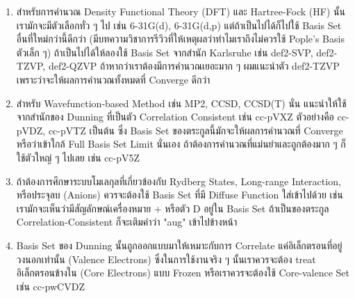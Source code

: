 \begin{enumerate}
  \item สำหรับการคำนวณ Density Functional Theory (DFT) และ Hartree-Fock (HF) นั้นเรามักจะมีตัวเลือกทั่ว ๆ ไป เช่น
        6-31G(d), 6-31G(d,p) แต่ถ้าเป็นไปได้ก็ไปใช้ Basis Set อื่นที่ใหม่กว่านี้ดีกว่า (มีบทความวิชาการรีวิวที่ให้เหตุผลว่าทำไมเราถึงไม่ควรใช้
        Pople's Basis ตัวเล็ก ๆ) ถ้าเป็นไปได้ให้ลองใช้ Basis Set จากสำนัก Karlsruhe เช่น def2-SVP, def2-TZVP, def2-QZVP
        ถ้าหากว่าเราต้องมีการคำนวณเยอะมาก ๆ ผมแนะนำตัว def2-TZVP เพราะว่าจะให้ผลการคำนวณทั้งหมดที่ Converge ดีกว่า

  \item สำหรับ Wavefunction-based Method เช่น MP2, CCSD, CCSD(T) นั่น แนะนำให้ใช้จากสำนักของ Dunning ที่เป็นตัว
        Correlation Consistent เช่น cc-pVXZ ตัวอย่างคือ cc-pVDZ, cc-pVTZ เป็นต้น ซึ่ง Basis Set ของตระกูลนี้มักจะให้ผลการคำนวณที่
        Converge หรือว่าเข้าใกล้ Full Basis Set Limit นั่นเอง ถ้าต้องการคำนวณที่แม่นยำและถูกต้องมาก ๆ ก็ใช้ตัวใหญ่ ๆ ไปเลย
        เช่น cc-pV5Z

  \item ถ้าต้องการศึกษาระบบโมเลกุลที่เกี่ยวข้องกับ Rydberg States, Long-range Interaction, หรือประจุลบ (Anions)
        ควรจะต้องใช้ Basis Set ที่มี Diffuse Function ใส่เข้าไปด้วย เช่น เรามักจะเห็นว่ามีสัญลักษณ์เครื่องหมาย + หรือตัว D อยู่ใน
        Basis Set ถ้าเป็นของตระกูล Correlation-Consistent ก็จะเติมคำว่า "aug" เข้าไปข้างหน้า

  \item Basis Set ของ Dunning นั้นถูกออกแบบมาให้เหมาะกับการ Correlate แค่อิเล็กตรอนที่อยู่วงนอกเท่านั้น (Valence Electrons)
        ซึ่งในการใช้งานจริง ๆ นั้นเราควรจะต้อง treat อิเล็กตรอนข้างใน (Core Electrons) แบบ Frozen หรือเราควรจะต้องใช้
        Core-valence Set เช่น cc-pwCVDZ
\end{enumerate}

